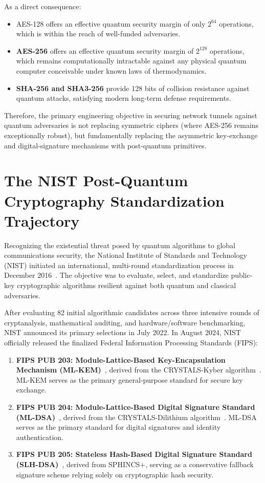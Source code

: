As a direct consequence:
\begin{itemize}
    \item AES-128 offers an effective quantum security margin of only $2^{64}$ operations, which is within the reach of well-funded adversaries.
    \item \textbf{AES-256} offers an effective quantum security margin of $2^{128}$ operations, which remains computationally intractable against any physical quantum computer conceivable under known laws of thermodynamics.
    \item \textbf{SHA-256 and SHA3-256} provide 128 bits of collision resistance against quantum attacks, satisfying modern long-term defense requirements.
\end{itemize}

Therefore, the primary engineering objective in securing network tunnels against quantum adversaries is not replacing symmetric ciphers (where AES-256 remains exceptionally robust), but fundamentally replacing the asymmetric key-exchange and digital-signature mechanisms with post-quantum primitives.

\section{The NIST Post-Quantum Cryptography Standardization Trajectory}
\label{sec:nist_standardization}

Recognizing the existential threat posed by quantum algorithms to global communications security, the National Institute of Standards and Technology (NIST) initiated an international, multi-round standardization process in December 2016~\cite{bernstein2017postquantum,stebila2020postquantum}. The objective was to evaluate, select, and standardize public-key cryptographic algorithms resilient against both quantum and classical adversaries.

After evaluating 82 initial algorithmic candidates across three intensive rounds of cryptanalysis, mathematical auditing, and hardware/software benchmarking, NIST announced its primary selections in July 2022. In August 2024, NIST officially released the finalized Federal Information Processing Standards (FIPS):
\begin{enumerate}
    \item \textbf{FIPS PUB 203: Module-Lattice-Based Key-Encapsulation Mechanism (ML-KEM)}~\cite{nist_fips_203}, derived from the CRYSTALS-Kyber algorithm~\cite{bos2018crystals}. ML-KEM serves as the primary general-purpose standard for secure key exchange.
    \item \textbf{FIPS PUB 204: Module-Lattice-Based Digital Signature Standard (ML-DSA)}~\cite{nist_fips_204}, derived from the CRYSTALS-Dilithium algorithm~\cite{ducas2018crystals}. ML-DSA serves as the primary standard for digital signatures and identity authentication.
    \item \textbf{FIPS PUB 205: Stateless Hash-Based Digital Signature Standard (SLH-DSA)}~\cite{nist_fips_205}, derived from SPHINCS+, serving as a conservative fallback signature scheme relying solely on cryptographic hash security.
\end{enumerate}

